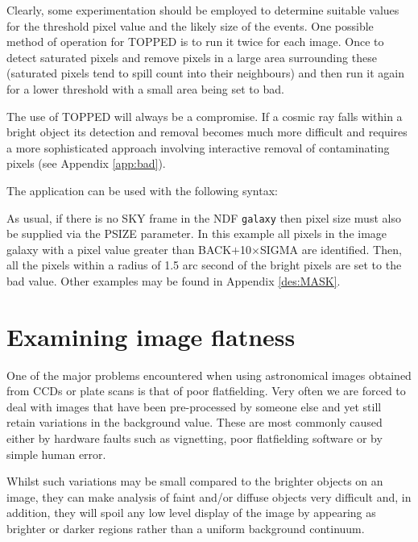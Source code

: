 \documentclass[twoside,11pt]{starlink}
\begin{document}
Clearly, some experimentation should be employed to determine
suitable values for the threshold pixel value and the likely size of the
events. One possible method of operation for TOPPED is to run it twice for
each image. Once to detect saturated pixels and remove pixels in a
large area surrounding these (saturated pixels tend to spill count into
their neighbours) and then run it again for a lower threshold with a small area
being set to bad.

The use of TOPPED will always be a compromise. If a cosmic ray falls
within a bright object its detection and removal becomes much more
difficult and requires a more sophisticated approach involving
interactive removal of contaminating pixels (see Appendix \ref{app:bad}).

The application can be used with the following syntax:

\begin{small}
\begin{terminalv}
\end{terminalv}
\end{small}

As usual, if there is no SKY frame in the NDF \texttt{galaxy}
then pixel size must also be supplied via the PSIZE parameter.
In this example all pixels in the image galaxy with a pixel value
greater than BACK$+$10$\times$SIGMA are identified. Then, all the pixels
within a radius of 1.5 arc second of the bright pixels are set to the
bad value. Other examples may be found in Appendix \ref{des:MASK}.


\section{Examining image flatness}
\label{sec:examining}

One of the major problems encountered when using astronomical images
obtained from CCDs or plate scans is that of poor flatfielding. Very often
we are forced to deal with images that have been pre-processed by
someone else and yet still retain variations in the background value.
These are most commonly caused either by hardware faults such as vignetting,
poor flatfielding software or by simple human error.

Whilst such variations may be small compared to the brighter
objects on an image, they can make analysis of faint and/or diffuse objects
very difficult and, in addition, they will spoil any low level display of the
image by appearing as brighter or darker regions rather than a uniform
background continuum.
\end{document}
